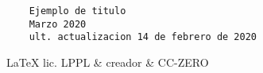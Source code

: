 \documentclass{article}
\begin{document}
\phantom{fgdd}
\newpage
\vspace*{\fill}
\begin{verbatim}
	Ejemplo de titulo
	Marzo 2020
	ult. actualizacion 14 de febrero de 2020
\end{verbatim}
\LaTeX{} lic. LPPL \& creador \& CC-ZERO
\doclicenseThis
\end{document}
